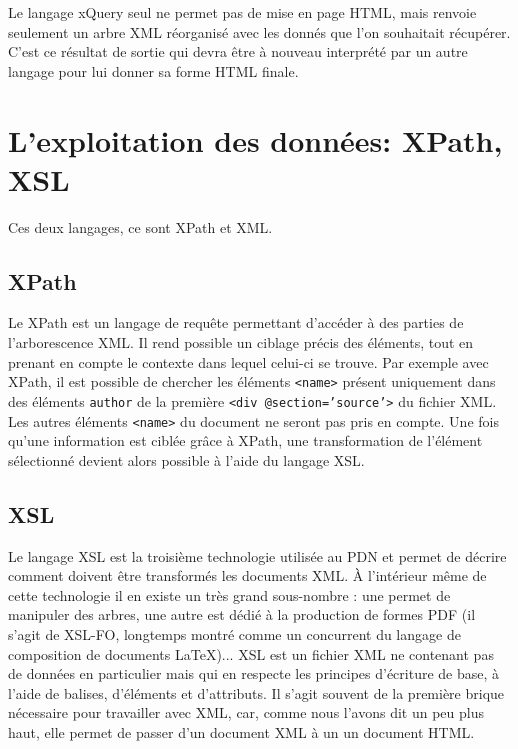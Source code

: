 \documentclass[a4paper,12pt,twoside]{book}
\begin{document}
Le langage xQuery seul ne permet pas de mise en page HTML, mais renvoie seulement un arbre XML réorganisé avec les donnés que l'on souhaitait récupérer. C'est ce résultat de sortie qui devra être à nouveau interprété par un autre langage pour lui donner sa forme HTML finale.

    \section{L'exploitation des données: XPath, XSL}

    Ces deux langages, ce sont XPath et XML.
    
    \subsection{XPath}
    Le \acrfull{XPath} est un langage de requête permettant d'accéder à des parties de l'arborescence XML. Il rend possible un ciblage précis des éléments, tout en prenant en compte le contexte dans lequel celui-ci se trouve. Par exemple avec XPath, il est possible de chercher les éléments \texttt{<name>} présent uniquement dans des éléments \texttt{author} de la première \texttt{<div @section='source'>} du fichier XML. Les autres éléments \texttt{<name>} du document ne seront pas pris en compte. Une fois qu'une information est ciblée grâce à XPath, une transformation de l'élément sélectionné devient alors possible à l'aide du langage XSL.
    
    \subsection{XSL}
    Le langage \acrfull{XSL} est la troisième technologie utilisée au \acrshort{PDN} et permet de décrire comment doivent être transformés les documents XML. À l'intérieur même de cette technologie il en existe un très grand sous-nombre : une permet de manipuler des arbres, une autre est dédié à la production de formes PDF (il s'agit de \acrshort{XSL-FO}, longtemps montré comme un concurrent du langage de composition de documents \LaTeX)... \acrshort{XSL} est un fichier \acrshort{XML} ne contenant pas de données en particulier mais qui en respecte les principes d'écriture de base, à l'aide de balises, d'éléments et d'attributs. Il s'agit souvent de la première brique nécessaire pour travailler avec \acrshort{XML}, car, comme nous l'avons dit un peu plus haut, elle permet de passer d'un document \acrshort{XML} à un un document \acrshort{HTML}.
    
\end{document}
